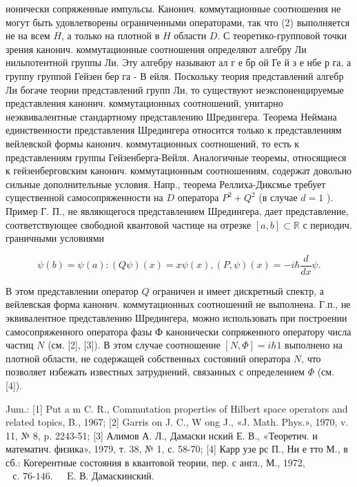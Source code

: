 \documentclass[10pt]{article}
\begin{document}
нонически сопряженные импульсы. Канонич. коммутационные соотношения не могут быть удовлетворены ограниченными операторами, так что (2) выполняется не на всем $H$, а только на плотной в $H$ области $D$. С теоретико-групповой точки зрения канонич. коммутационные соотношения определяют алгебру Ли нильпотентной группы Ли. Эту алгебру называют ал г е бр ой Ге й з е нбе р га, а группу группой Гейзен бер га - В ейля. Поскольку теория представлений алгебр Ли богаче теории представлений групп Ли, то существуют неэкспоненцируемые представления канонич. коммутационных соотношений, унитарно неэквивалентные стандартному представлению Шредингера. Теорема Неймана единственности представления Шредингера относится только к представлениям вейлевской формы канонич. коммутационных соотношений, то есть к представлениям группы Гейзенберга-Вейля. Аналогичные теоремы, относящиеся к гейзенберговским канонич. коммутационным соотношениям, содержат довольно сильные дополнительные условия. Напр., теорема Реллиха-Диксмье требует существенной самосопряженности на $D$ оператора $P^{2}+Q^{2}$ (в случае $d=1$ ). Пример Г. П., не являющегося представлением Шредингера, дает представление, соответствующее свободной квантовой частице на отрезке $[a, b] \subset \mathbb{R}$ с периодич. граничными условиями



\[

\psi(b)=\psi(a):(Q \psi)(x)=x \psi(x),(P, \psi)(x)=-i \hbar \frac{d}{d x} \psi .

\]



В этом представлении оператор $Q$ ограничен и имеет дискретный спектр, а вейлевская форма канонич. коммутационных соотношений не выполнена. Г.п., не эквивалентное представлению Шредингера, можно использовать при построении самосопряженного оператора фазы Ф канонически сопряженного оператору числа частиц $N$ (см. [2], [3]). В этом случае соотношение $[N, \Phi]=i \hbar 1$ выполнено на плотной области, не содержащей собственных состояний оператора $N$, что позволяет избежать известных затруднений, связанных с определением $\Phi$ (см. [4]).



Jum.: [1] Put a m C. R., Commutation properties of Hilbert space operators and related topics, B., 1967; [2] Garris on J. C., W ong J., «J. Math. Phys.», 1970, v. 11, № 8, p. 2243-51; [3] Алимов А. Л., Дамаски нский Е. В., «Теоретич. и математич. физика», 1979, т. 38, № 1, с. 58-70; [4] Карр узе рс П., Ни е тто М., в сб.: Когерентные состояния в квантовой теории, пер. с англ., М., 1972, $\begin{array}{ll}\text { с. 76-146. } & \text { E. В. Дамаскинский. }\end{array}$
\end{document}
